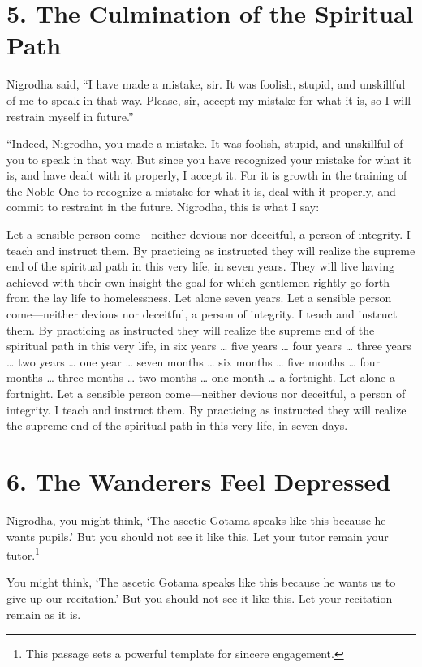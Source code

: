 \documentclass[12pt,openany]{book}%
\begin{document}
\section*{5. The Culmination of the Spiritual Path }

Nigrodha said, “I have made a mistake, sir. It was foolish, stupid, and unskillful of me to speak in that way. Please, sir, accept my mistake for what it is, so I will restrain myself in future.” 

“Indeed, Nigrodha, you made a mistake. It was foolish, stupid, and unskillful of you to speak in that way. But since you have recognized your mistake for what it is, and have dealt with it properly, I accept it. For it is growth in the training of the Noble One to recognize a mistake for what it is, deal with it properly, and commit to restraint in the future. Nigrodha, this is what I say: 

Let a sensible person come—neither devious nor deceitful, a person of integrity. I teach and instruct them. By practicing as instructed they will realize the supreme end of the spiritual path in this very life, in seven years. They will live having achieved with their own insight the goal for which gentlemen rightly go forth from the lay life to homelessness. Let alone seven years. Let a sensible person come—neither devious nor deceitful, a person of integrity. I teach and instruct them. By practicing as instructed they will realize the supreme end of the spiritual path in this very life, in six years … five years … four years … three years … two years … one year … seven months … six months … five months … four months … three months … two months … one month … a fortnight. Let alone a fortnight. Let a sensible person come—neither devious nor deceitful, a person of integrity. I teach and instruct them. By practicing as instructed they will realize the supreme end of the spiritual path in this very life, in seven days. 

\section*{6. The Wanderers Feel Depressed }

Nigrodha, you might think, ‘The ascetic Gotama speaks like this because he wants pupils.’ But you should not see it like this. Let your tutor remain your tutor.\footnote{This passage sets a powerful template for sincere engagement. } 

You might think, ‘The ascetic Gotama speaks like this because he wants us to give up our recitation.’ But you should not see it like this. Let your recitation remain as it is. 
\end{document}
